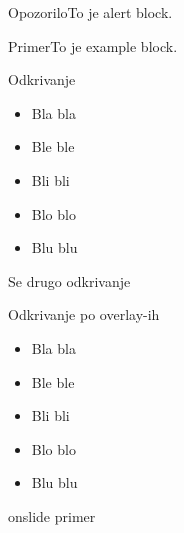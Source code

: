 \documentclass[14pt]{beamer}
\begin{document}
\begin{frame}

\begin{alertblock}{Opozorilo}To je alert block.\end{alertblock}
\pause
\begin{exampleblock}{Primer}To je example block. \end{exampleblock}
\pause
\begin{block}{Odkrivanje}
\begin{itemize}[<+->]
\item Bla bla
\item Ble ble
\item Bli bli
\item Blo blo
\item Blu blu
\end{itemize}
\end{block}


\end{frame}

\begin{frame}{Se drugo odkrivanje}
\begin{block}{Odkrivanje po overlay-ih}
\begin{itemize}
\item<2> Bla bla       %
\item<3,5> Ble ble     %
\item<4-> Bli bli      %
\item<6> Blo blo       %
\item<7-> Blu blu      %
\end{itemize}
\end{block}
\end{frame}

\begin{frame}{onslide primer} %




\end{frame}
\bigbreak
\end{document}
